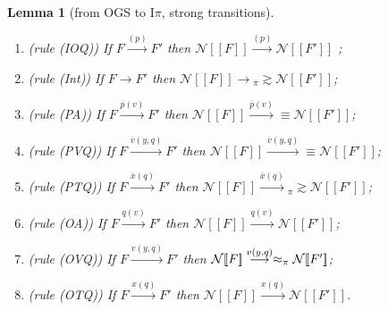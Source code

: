 \documentclass[11pt,a4paper]{amsart}
\theoremstyle{plain}
\theoremstyle{definition}
\theoremstyle{defC}
\theoremstyle{thmC}
\theoremstyle{plain}
\numberwithin{equation}{section}
\newcommand{\wb}{\bsim}
\newcommand{\bsim}{\wbPI} %
\newcommand{\caserule}[1]{(rule (#1))}
\def\inp#1#2{#1(#2)}
\def\bout#1#2{\overline{#1}(#2)}   %
\newcommand{\rmm}[1]{{\tt{\lowercase{#1}}}}
\newcommand{\arr}[1]{\mathrel{\stackrel{{#1}}{\longrightarrow}}}  %
\newcommand{\genwb}[1]{\mathrel{\approx_{\rmm{\lowercase{#1}}}}}       %
\newcommand{\wbPI}{\genwb{\pi}}       %
\newcommand{\contr}{\mathrel{\mbox{}_{\pi}\!\!\gtrsim}}
\newcommand{\encoN}[1]{{\mathcal {N}} [\! [ #1 ] \! ]  }
\newcommand{\Intp}{\mbox{I$\pi$}\xspace}   %
\newcommand{\piI}{\Intp}   %
\newcommand{\initName}{}
\theoremstyle{plain}
\newtheorem{theorem}[thm]{Theorem}
\newtheorem{lemma}[thm]{Lemma}
\theoremstyle{definition}
\begin{document}
\begin{lemma}[from OGS to \piI, strong transitions]
\label{l:opcorrCON_cbn}
$ $ \begin{enumerate}

\item \caserule{IOQ}  If $F \arr{\initName (p)} F'$ then 
$\encoN{F } \arr  {\initName (p)}  
 \encoN{F'}$ ; 


\item  \caserule{Int} If $F \longrightarrow F'$ then 
$ \encoN F \longrightarrow  \contr \encoN {F'}$; 

\item  \caserule{PA} If $F \arr{\bout pv} F'$ then 
$ \encoN F \arr{\bout pv}  \equiv  \encoN {F'}$; 
\item  \caserule{PVQ} If $F \arr{\bout v {y,q}} F'$ then 
$ \encoN F \arr{\bout v {y,q}}   \equiv  \encoN {F'}$; 
\item  \caserule{PTQ} If $F \arr{\bout x {q}} F'$ then 
$ \encoN F \arr{\bout x {q}}  \contr  \encoN {F'}$; 
\item  \caserule{OA} If $F \arr{\inp  {q} v} F'$ then 
$ \encoN F\arr{\inp  {q} v}    \encoN {F'}$; 
\item  \caserule{OVQ} If $F \arr{\inp   v{y,q}} F'$ then 
$ \encoN F\arr{\inp   v{y,q}}  \wb  \encoN {F'}$; 
\item  \caserule{OTQ} If $F \arr{\inp   x{q}} F'$ then 
$ \encoN F\arr{\inp   x{q}}    \encoN {F'}$.
\end{enumerate}
\end{lemma} 





\end{document}
